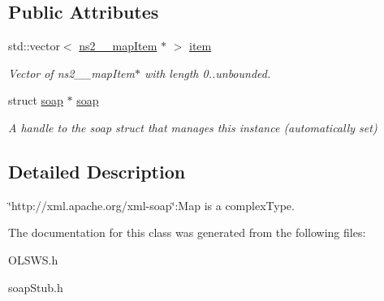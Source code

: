 \subsection*{Public Attributes}
\begin{DoxyCompactItemize}
\item 
\hypertarget{classns2____Map_a5b69e13c0ae30ef89a11993e9a2d0062}{
std::vector$<$ \hyperlink{classns2____mapItem}{ns2\_\-\_\-mapItem} $\ast$ $>$ \hyperlink{classns2____Map_a5b69e13c0ae30ef89a11993e9a2d0062}{item}}
\label{classns2____Map_a5b69e13c0ae30ef89a11993e9a2d0062}

\begin{DoxyCompactList}\small\item\em Vector of ns2\_\-\_\-mapItem$\ast$ with length 0..unbounded. \end{DoxyCompactList}\item 
\hypertarget{classns2____Map_aba9307fd142850a3b4a3b13e4c649572}{
struct \hyperlink{classns2____Map_aba9307fd142850a3b4a3b13e4c649572}{soap} $\ast$ \hyperlink{classns2____Map_aba9307fd142850a3b4a3b13e4c649572}{soap}}
\label{classns2____Map_aba9307fd142850a3b4a3b13e4c649572}

\begin{DoxyCompactList}\small\item\em A handle to the soap struct that manages this instance (automatically set) \end{DoxyCompactList}\end{DoxyCompactItemize}


\subsection{Detailed Description}
\char`\"{}http://xml.apache.org/xml-\/soap\char`\"{}:Map is a complexType. 

The documentation for this class was generated from the following files:\begin{DoxyCompactItemize}
\item 
OLSWS.h\item 
soapStub.h\end{DoxyCompactItemize}
